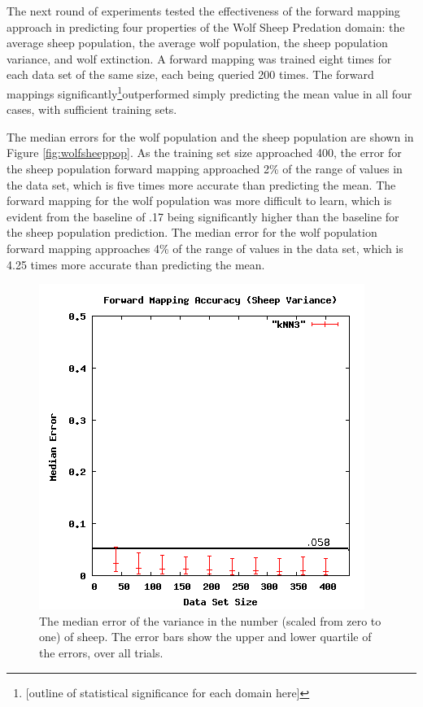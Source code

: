 The next round of experiments tested the effectiveness of the forward mapping approach in predicting four properties of the Wolf Sheep Predation domain: the average sheep population, the average wolf population, the sheep population variance, and wolf extinction.
A forward mapping was trained eight times for each data set of the same size, each being queried 200 times.
The forward mappings significantly\footnote{[outline of statistical significance for each domain here]}outperformed simply predicting the mean value in all four cases, with sufficient training sets.

The median errors for the wolf population and the sheep population are shown in Figure \ref{fig:wolfsheeppop}.
As the training set size approached 400, the error for the sheep population forward mapping approached 2\% of the range of values in the data set, which is five times more accurate than predicting the mean.
The forward mapping for the wolf population was more difficult to learn, which is evident from the baseline of .17 being significantly higher than the baseline for the sheep population prediction.
The median error for the wolf population forward mapping approaches 4\% of the range of values in the data set, which is 4.25 times more accurate than predicting the mean.

\begin{figure}[ht]
\centering
\includegraphics[scale=.5]{images/results_wolfsheep/fm-sheep-var.png}
\caption{The median error of the variance in the number (scaled from zero to one) of sheep.
The error bars show the upper and lower quartile of the errors, over all trials.}
\label{fig:wolfsheepvar}
\end{figure}

